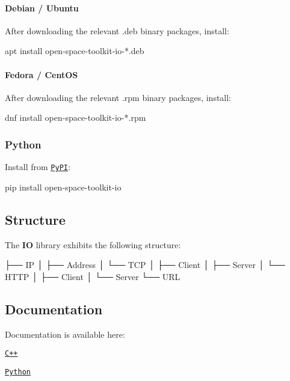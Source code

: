 \paragraph*{Debian / Ubuntu}

After downloading the relevant {\ttfamily .deb} binary packages, install\+:


\begin{DoxyCode}
apt install open-space-toolkit-io-*.deb
\end{DoxyCode}


\paragraph*{Fedora / Cent\+OS}

After downloading the relevant {\ttfamily .rpm} binary packages, install\+:


\begin{DoxyCode}
dnf install open-space-toolkit-io-*.rpm
\end{DoxyCode}


\subsubsection*{Python}

Install from \href{https://pypi.org/project/open-space-toolkit-io/}{\tt Py\+PI}\+:


\begin{DoxyCode}
pip install open-space-toolkit-io
\end{DoxyCode}


\subsection*{Structure}

The {\bfseries IO} library exhibits the following structure\+:


\begin{DoxyCode}
├── IP
│   ├── Address
│   └── TCP
│       ├── Client
│       ├── Server
│       └── HTTP
│           ├── Client
│           └── Server
└── URL
\end{DoxyCode}


\subsection*{Documentation}

Documentation is available here\+:


\begin{DoxyItemize}
\item \href{https://open-space-collective.github.io/open-space-toolkit-io}{\tt C++}
\item \href{./bindings/python/docs}{\tt Python}
\end{DoxyItemize}

